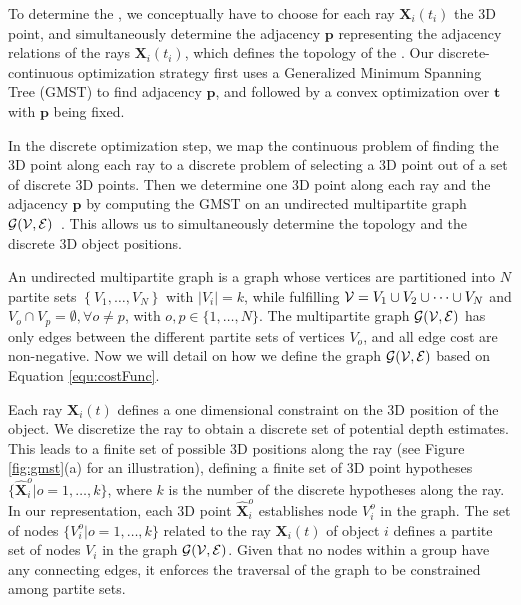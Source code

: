 \label{sec:gmst}
To determine the \oct, we conceptually have to choose for each ray $\mathbf{X}_i(t_i) $ the 3D point, and simultaneously determine the adjacency $\mathbf{p}$ representing the adjacency relations of the rays $\mathbf{X}_i(t_i) $, which defines the topology of the \oct.
Our discrete-continuous optimization strategy first uses a Generalized Minimum Spanning Tree (GMST) to find adjacency $\mathbf{p}$, and followed by a convex optimization over $\mathbf{t}$ with $\mathbf{p}$ being fixed.

In the discrete optimization step, we map the continuous problem of finding the 3D point along each ray to a discrete problem of selecting a 3D point out of a set of discrete 3D points. Then we determine one 3D point along each ray and the adjacency $\mathbf{p}$ by computing the GMST on an undirected multipartite graph $\cal{G}(V,E)$~\cite{MyungLT_95}. This allows us to simultaneously  determine the topology and the discrete 3D object positions.

An undirected multipartite graph is a graph whose vertices are partitioned into $N$ partite sets $\left\{V_1, \dots, V_N\right\}$ with $\vert V_i \vert = k$, while fulfilling ${\cal V}=V_1 \cup V_2 \cup \dots \cup V_N$ and $V_o \cap V_p = \emptyset, \forall o\neq p$, with $o,p \in \{1, \dots, N \}$. The multipartite graph $\cal{G}(V,E)$ has only edges between the different partite sets  of vertices $V_o$, and all edge cost are non-negative. Now we will detail on how we define the graph $\cal{G}(V,E)$ based on Equation \ref{equ:costFunc}.

Each ray $\mathbf{X}_i(t)$ defines a one dimensional constraint on the 3D position of the object. We discretize the ray to obtain a discrete set of potential depth estimates. This leads to a finite set of possible 3D positions along the ray (see Figure \ref{fig:gmst}(a) for an illustration), defining a finite set of 3D point hypotheses %
$\{\mathbf{\hat{X}}_i^o|o=1,\dots,k \}$,
where $k$ is the number of the discrete hypotheses along the ray.
In our representation, each 3D point $\mathbf{\hat{X}}_i^o$ establishes node $V_i^o$ in the graph. The set of nodes $\{V_i^o|o=1, \dots, k\}$ related to the ray $\mathbf{X}_i(t)$ of object $i$ defines a partite set of nodes $V_i$ in the graph $\cal{G}(V,E)$. 
Given that no nodes within a group have any connecting edges, it enforces the traversal of the graph to be constrained among partite sets. 

